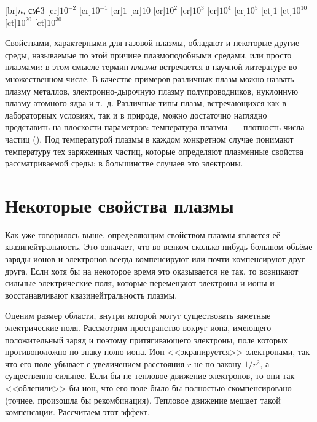 		[br]{\footnotesize $n$, см\^{-3}}
		[cr]{\footnotesize $10^{-2}$}
		[cr]{\footnotesize $10^{-1}$}
		[cr]{\footnotesize $1$}
		[cr]{\footnotesize $10$}
		[cr]{\footnotesize $10^{2}$}
		[cr]{\footnotesize $10^{3}$}
		[cr]{\footnotesize $10^{4}$}
		[cr]{\footnotesize $10^{5}$}
		[ct]{\footnotesize $1$}
		[ct]{\footnotesize $10^{10}$}
		[ct]{\footnotesize $10^{20}$}
		[ct]{\footnotesize $10^{30}$}




Свойствами, характерными для газовой плазмы, обладают и некоторые другие среды, называемые по этой причине
плазмоподобными средами, или просто плазмами: в этом смысле термин {\em плазма} встречается в научной литературе во
множественном числе. В качестве примеров различных плазм можно назвать плазму металлов, электронно-дырочную плазму
полупроводников, нуклонную плазму атомного ядра и т.~д. Различные типы плазм, встречающихся как в лабораторных условиях,
так и в природе, можно достаточно наглядно представить на плоскости параметров: температура плазмы~--- плотность числа
частиц (). Под температурой плазмы в каждом конкретном случае понимают температуру тех заряженных частиц, которые
определяют плазменные свойства рассматриваемой среды: в большинстве случаев это электроны.

\section{Некоторые свойства плазмы}

Как уже говорилось выше, определяющим свойством плазмы является её квазинейтральность. Это означает, что во всяком
сколько-нибудь большом объёме заряды ионов и электронов всегда компенсируют или почти компенсируют друг друга. Если хотя
бы на некоторое время это оказывается не так, то возникают сильные электрические поля, которые перемещают электроны и
ионы и восстанавливают квазинейтральность плазмы.

Оценим размер области, внутри которой могут существовать заметные электрические поля. Рассмотрим пространство вокруг
иона, имеющего положительный заряд и поэтому притягивающего электроны, поле которых противоположно по знаку полю иона.
Ион <<экранируется>> электронами, так что его поле убывает с увеличением расстояния $r$ не по закону $1/r^2$, а
существенно сильнее. Если бы не тепловое движение электронов, то они так <<облепили>> бы ион, что его поле было бы
полностью скомпенсировано (точнее, произошла бы рекомбинация). Тепловое движение мешает такой компенсации. Рассчитаем
этот эффект.

